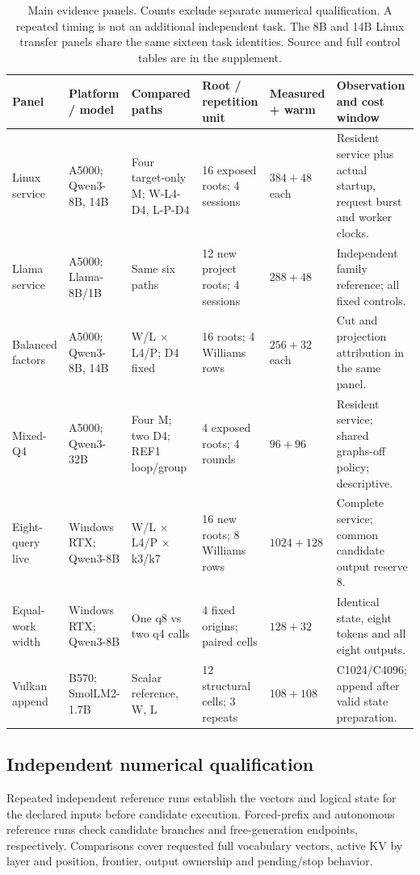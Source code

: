 \begin{table}[t]
\centering\footnotesize\tighttable
\caption{Main evidence panels. Counts exclude separate numerical qualification. A repeated timing is not an additional independent task. The 8B and 14B Linux transfer panels share the same sixteen task identities. Source and full control tables are in the supplement.}
\label{tab:panels}
\begin{tabularx}{\textwidth}{@{}L{2.00cm}L{2.22cm}L{2.40cm}L{1.64cm}L{1.40cm}Y@{}}\toprule
Panel & Platform / model & Compared paths & Root / repetition unit & Measured + warm & Observation and cost window\\\midrule
Linux service & A5000; Qwen3-8B, 14B & Four target-only M; W-L4-D4, L-P-D4 & 16 exposed roots; 4 sessions & $384+48$ each & Resident service plus actual startup, request burst and worker clocks.\\
Llama service & A5000; Llama-8B/1B & Same six paths & 12 new project roots; 4 sessions & $288+48$ & Independent family reference; all fixed controls.\\
Balanced factors & A5000; Qwen3-8B, 14B & W/L $\times$ L4/P; D4 fixed & 16 roots; 4 Williams rows & $256+32$ each & Cut and projection attribution in the same panel.\\
Mixed-Q4 & A5000; Qwen3-32B & Four M; two D4; REF1 loop/group & 4 exposed roots; 4 rounds & $96+96$ & Resident service; shared graphs-off policy; descriptive.\\
Eight-query live & Windows RTX; Qwen3-8B & W/L $\times$ L4/P $\times$ k3/k7 & 16 new roots; 8 Williams rows & $1024+128$ & Complete service; common candidate output reserve 8.\\
Equal-work width & Windows RTX; Qwen3-8B & One q8 vs two q4 calls & 4 fixed origins; paired cells & $128+32$ & Identical state, eight tokens and all eight outputs.\\
Vulkan append & B570; SmolLM2-1.7B & Scalar reference, W, L & 12 structural cells; 3 repeats & $108+108$ & C1024/C4096; append after valid state preparation.\\\bottomrule
\end{tabularx}
\end{table}

\subsection{Independent numerical qualification}
Repeated independent reference runs establish the vectors and logical state for the declared inputs before candidate execution. Forced-prefix and autonomous reference runs check candidate branches and free-generation endpoints, respectively. Comparisons cover requested full vocabulary vectors, active KV by layer and position, frontier, output ownership and pending/stop behavior.

